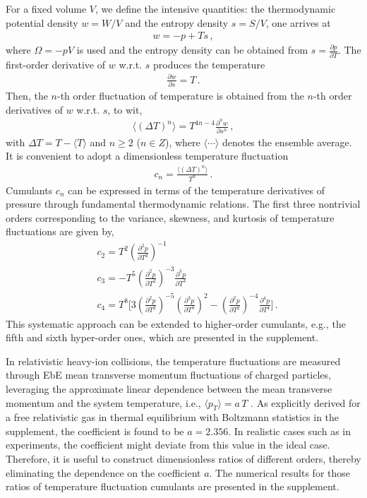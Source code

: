 \documentclass[aps,twocolumn,
prl,
superscriptaddress,nofootinbib,floatfix]{revtex4-2}
\begin{document}
For a fixed volume $V$, we define the intensive quantities: the thermodynamic potential density $w=W/V$ and the entropy density $s=S/V$, one arrives at
\begin{align}
    w=-p+T s\,, \label{}
\end{align}
where $\Omega=-pV$ is used and the entropy density can be obtained from $s=\frac{\partial p}{\partial T}$. The first-order derivative of $w$ w.r.t. $s$ produces the temperature
\begin{align}
    \frac{\partial w}{\partial s}=T\,. \label{}
\end{align}
Then, the $n$-th order fluctuation of temperature is obtained from the $n$-th order derivatives of $w$ w.r.t. $s$, to wit,
\begin{align}
    \langle(\Delta T)^n \rangle=T^{4n-4}\frac{\partial^n w}{\partial s^n}\,, \label{eq:DeltaTn}
\end{align}
with $\Delta T=T-\langle T \rangle$ and $n\geq 2$ ($n \in Z$), where $\langle \cdots \rangle$ denotes the ensemble average. It is convenient to adopt a dimensionless temperature fluctuation
\begin{align}
    c_n=\frac{\langle(\Delta T)^n \rangle}{T^n}\,. \label{eq:cn}
\end{align}
Cumulants $c_n$ can be expressed in terms of the temperature derivatives of pressure through fundamental thermodynamic relations. The first three nontrivial orders corresponding to the variance, skewness, and kurtosis of temperature fluctuations are given by,
\begin{equation}\label{eq:c234}\begin{split}
    & c_2=T^2\left(\frac{\partial^2 p}{\partial T^2}\right)^{-1}\,\\[2ex]
    & c_3=-T^5\left(\frac{\partial^2 p}{\partial T^2}\right)^{-3}\frac{\partial^3 p}{\partial T^3}\,\\[2ex]
    & c_4=T^8\Bigg[3\left(\frac{\partial^2 p}{\partial T^2}\right)^{-5}\left(\frac{\partial^3 p}{\partial T^3}\right)^2-\left(\frac{\partial^2 p}{\partial T^2}\right)^{-4}\frac{\partial^4 p}{\partial T^4}\Bigg]\,.
\end{split} 
\end{equation}
This systematic approach can be extended to higher-order cumulants, e.g., the fifth and sixth hyper-order ones, which are presented in the supplement.

In relativistic heavy-ion collisions, the temperature fluctuations are measured through EbE mean transverse momentum fluctuations of charged particles, leveraging the approximate linear dependence between the mean transverse momentum and the system temperature, i.e., $\langle p_{T} \rangle = a\,T$ \cite{Gardim:2019xjs, Gardim:2019brr, Giacalone:2020lbm, Gardim:2024zvi}. As explicitly derived for a free relativistic gas in thermal equilibrium with Boltzmann statistics in the supplement, the coefficient is found to be $a=2.356$. In realistic cases such as in experiments, the coefficient might deviate from this value in the ideal case. Therefore, it is useful to construct dimensionless ratios of different orders, thereby eliminating the dependence on the coefficient $a$. The numerical results for those ratios of temperature fluctuation cumulants are presented in the supplement.
\end{document}
